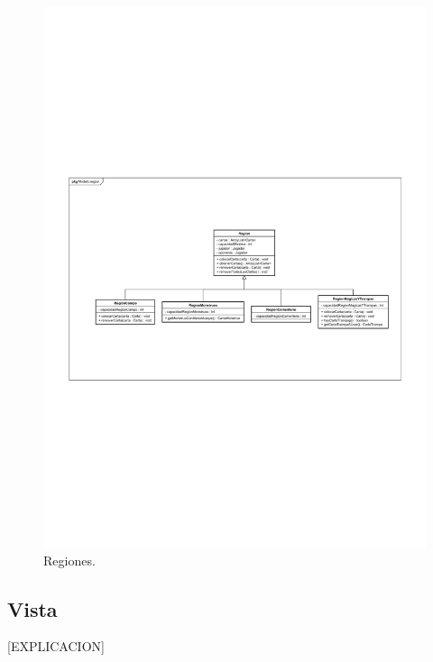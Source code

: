 \begin{figure}[H]
	\centering
	\includegraphics[scale=0.8]{includes/class_Regiones}
	\caption{Regiones.}
	\label{class_Regiones}
\end{figure}

\subsection{Vista}

[EXPLICACION]

